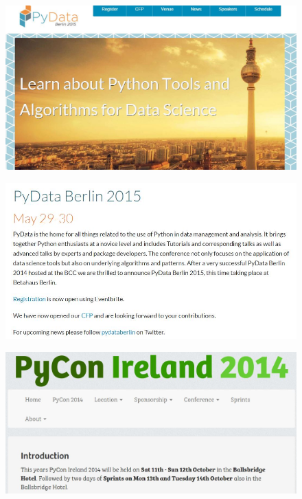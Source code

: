 \documentclass[MASTER.tex]{subfiles}
\begin{document}
	\begin{frame}\begin{figure}
\centering
\includegraphics[width=1.05\linewidth]{pydataberlin}

\end{figure}
	\end{frame}
	\begin{frame}
		\begin{figure}

\centering
\includegraphics[width=1.10\linewidth]{pydataberlinsiteinfo}

\end{figure}
\end{frame}
\begin{frame}
	
\begin{figure}
\centering
\includegraphics[width=1.1\linewidth]{pyconsiteinfo}

\end{figure}
\end{frame}
\end{document}
